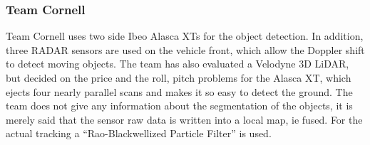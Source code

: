 \documentclass[11pt,oneside,openright]{mpreport}
\begin{document}
\subsubsection{Team Cornell}
Team Cornell \cite{Campbell2007} uses two side Ibeo Alasca XTs for the object detection. In addition, three RADAR sensors are used on the vehicle front, 
which allow the Doppler shift to detect moving objects. The team has also evaluated a Velodyne 3D LiDAR, but decided on the price and the roll, pitch problems
for the Alasca XT, which ejects four nearly parallel scans and makes it so easy to detect the ground. The team does not give any information about the
segmentation of the objects, it is merely said that the sensor raw data is written into a local map, ie fused. For the actual tracking a 
``Rao-Blackwellized Particle Filter'' \cite{miller2007rao} is used.
\end{document}

